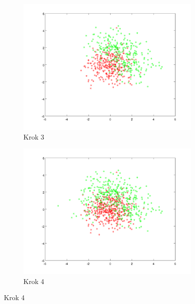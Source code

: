 \documentclass[10pt,a4paper]{article}
\begin{document}
\begin{figure}[h]
   \begin{subfigure}[b]{0.4\textwidth}
    \includegraphics[width=\textwidth]{dataGen_step2.png}
    \caption{Krok 3}
  \end{subfigure}
  \hfill
  \begin{subfigure}[b]{0.4\textwidth}
    \includegraphics[width=\textwidth]{dataGen_step3.png}
    \caption{Krok 4}
  \end{subfigure}
  

\end{figure}
\end{document}
